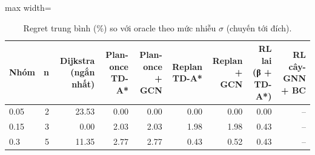 \begin{table}[!htbp]
\centering
\small
\caption{Regret trung bình (\%) so với oracle theo mức nhiễu $\sigma$ (chuyến tới đích).}
\label{tab:tab_by_sigma}
\begin{adjustbox}{max width=\linewidth}
\begin{tabular}{lrrrrrrrr}
\toprule
Nhóm & n & Dijkstra (ngắn nhất) & Plan-once TD-A* & Plan-once + GCN & Replan TD-A* & Replan + GCN & RL lai (β + TD-A*) & RL cây-GNN + BC \\
\midrule
0.05 & 2 & 23.53 & 0.00 & 0.00 & 0.00 & 0.00 & 0.00 & -- \\
0.15 & 3 & 0.00 & 2.03 & 2.03 & 1.98 & 1.98 & 0.43 & -- \\
0.3 & 5 & 11.35 & 2.77 & 2.77 & 0.43 & 0.52 & 0.43 & -- \\
\bottomrule
\end{tabular}
\end{adjustbox}
\end{table}
